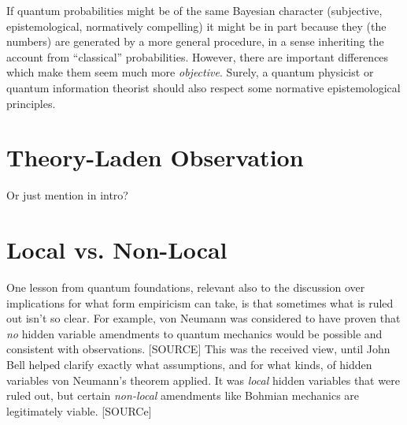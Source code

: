 \documentclass{article}
\begin{document}
If quantum probabilities might be of the same Bayesian character (subjective, epistemological, normatively compelling) it might be in part because they (the numbers) are generated by a more general procedure, in a sense inheriting the account from ``classical'' probabilities.  However, there are important differences which make them seem much more \emph{objective}.  Surely, a quantum physicist or quantum information theorist should also respect some normative epistemological principles.  
 








\section{Theory-Laden Observation}

Or just mention in intro?



\section{Local vs. Non-Local}

One lesson from quantum foundations, relevant also to the discussion over implications for what form empiricism can take, is that sometimes what is ruled out isn't so clear.  For example, von Neumann was considered to have proven that \emph{no} hidden variable amendments to quantum mechanics would be possible and consistent with observations.  [SOURCE]  This was the received view, until John Bell helped clarify exactly what assumptions, and for what kinds, of hidden variables von Neumann's theorem applied.  It was \emph{local} hidden variables that were ruled out, but certain \emph{non-local} amendments like Bohmian mechanics are legitimately viable.  [SOURCe]
\end{document}
